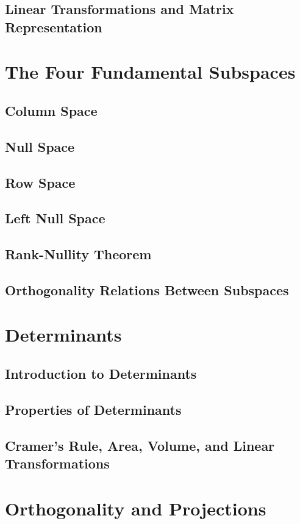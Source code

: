 \documentclass[11pt]{article}
\begin{document}
\subsection{Linear Transformations and Matrix Representation}

\section{The Four Fundamental Subspaces}
\subsection{Column Space}
\subsection{Null Space}
\subsection{Row Space}
\subsection{Left Null Space}
\subsection{Rank-Nullity Theorem}
\subsection{Orthogonality Relations Between Subspaces}

\section{Determinants}
\subsection{Introduction to Determinants}
\subsection{Properties of Determinants}
\subsection{Cramer's Rule, Area, Volume, and Linear Transformations}

\section{Orthogonality and Projections}
\end{document}
